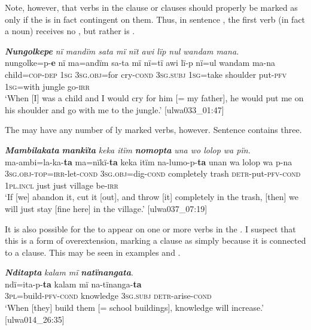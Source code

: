   Note, however, that verbs in the  clause or clauses should properly be marked as  only if the  is in fact contingent on them. Thus, in sentence , the first verb (in fact a  noun) receives no  , but rather is .

\ea%
    \label{ex:syntax:254}
          \textbf{\textit{Nungolkepe}} \textit{nï mandïm sata mï nït awi lïp nul wandam mana.}\\
\gll    nungolke=p-\textbf{e}    nï    ma=andïm    sa-ta    mï nï=tï    awi      lï-p      nï=ul    wandam  ma-na\\
    child=\textsc{cop{}-dep}  \textsc{1sg}  \textsc{3sg.obj=}for  cry\textsc{{}-cond}  \textsc{3sg.subj}    \textsc{1sg=}take  shoulder  put-\textsc{pfv}  \textsc{1sg=}with  jungle    go-\textsc{irr}\\
\glt `When [I] was a child and I would cry for him [= my father], he would put me on his shoulder and go with me to the jungle.’ [ulwa033\_01:47]
\z

The  may have any number of ly marked verbs, however. Sentence  contains three.

\ea%
    \label{ex:syntax:255}
          \textbf{\textit{Mambilakata}} \textbf{\textit{mankïta}} \textit{keka itïm} \textbf{\textit{nomopta}} \textit{una wo lolop wa pïn.}\\
\gll    ma-ambi=la-ka-\textbf{ta}        ma=nïkï-\textbf{ta}      keka     itïm  na-lumo-p-\textbf{ta}      unan    wa  lolop  wa    p-na\\
    3\textsc{sg.obj-top}=\textsc{irr-}let-\textsc{cond}  \textsc{3sg.obj}=dig{}-\textsc{cond}  completely    trash  \textsc{detr-}put-\textsc{pfv-cond}  \textsc{1pl.incl}  just  just    village  be-\textsc{irr}\\
\glt `If [we] abandon it, cut it [out], and throw [it] completely in the trash, [then] we will just stay [fine here] in the village.’ [ulwa037\_07:19]
\z

It is also possible for the   to appear on one or more verbs in the . I suspect that this is a form of overextension, marking a clause as  simply because it is connected to a  clause. This may be seen in examples  and .

\ea%
    \label{ex:syntax:256}
          \textbf{\textit{Nditapta}} \textit{kalam mï} \textbf{\textit{natïnangata}}.\\
\gll ndï=ita-p-\textbf{ta}      kalam    mï      na-tïnanga-\textbf{ta}\\
    3\textsc{pl}=build-\textsc{pfv-cond}  knowledge  3\textsc{sg.subj}  \textsc{detr}{}-arise-\textsc{cond}\\
\glt `When [they] build them [= school buildings], knowledge will increase.’ [ulwa014\_26:35]
\z

